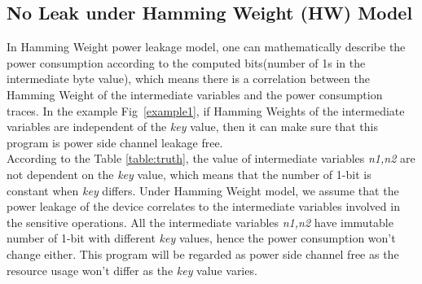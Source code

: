 \documentclass[10pt, conference]{IEEEtran}
\begin{document}
\subsection{No Leak under Hamming Weight (HW) Model}
In Hamming Weight power leakage model, one can mathematically describe the power consumption according to the computed bits(number of 1s in the intermediate byte value), which means there is a correlation between the Hamming Weight of the intermediate variables and the power consumption traces. In the example Fig~\ref{example1}, if Hamming Weights of the intermediate variables are independent of the \emph{key} value, then it can make sure that this program is power side channel leakage free. 
\\
According to the Table \ref{table:truth}, the value of intermediate variables \emph{n1,n2} are not dependent on the \emph{key} value, which means that the number of 1-bit is constant when \emph{key} differs. Under Hamming Weight model, we assume that the power leakage of the device correlates to the intermediate variables involved in the sensitive operations. All the intermediate variables \emph{n1,n2} have immutable number of 1-bit with different \emph{key} values, hence the power consumption won't change either. This program will be regarded as power side channel free as the resource usage won't differ as the \emph{key} value varies.
\end{document}
